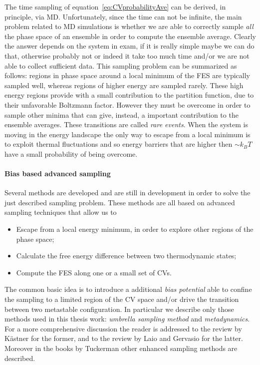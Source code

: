 The time sampling of equation~\eqref{eq:CVprobabilityAve} can be
derived, in principle, via \ac{MD}. Unfortunately, since the time can not be infinite, the main problem related
to \ac{MD} simulations is whether we are able to correctly sample \textit{all} the phase space of an ensemble in
order to compute the ensemble average. Clearly the answer depends on the system in exam, if it is really simple
maybe we can do that, otherwise probably not or indeed it take too much time and/or we are not able to collect
sufficient data. This sampling problem can be summarized as follows: regions in phase space around a local
minimum of the \ac{FES} are typically sampled well, whereas regions of higher energy are sampled rarely. These
high energy regions provide with a small contribution to the partition function, due to their unfavorable
Boltzmann factor. However they must be overcome in order to sample other minima that can give, instead, a
important contribution to the ensemble averages. These transitions are called \textit{rare events}. When the
system is moving in the energy landscape the only way to escape from a local minimum is to exploit thermal
fluctuations and so energy barriers that are higher then $\sim k_B T$ have a small probability of being overcome.

\paragraph{\textbf{Bias based advanced sampling}} Several methods are developed and are still in development in
order to solve the just described sampling problem. These methods are all based on advanced sampling techniques
that allow us to
\begin{itemize}
	\item Escape from a local energy minimum, in order to explore other regions of the phase space;
	\item Calculate the free energy difference between two thermodynamic states;
	\item Compute the \ac{FES} along one or a small set of \acp{CV}.
\end{itemize}
The common basic idea is to introduce a additional \textit{bias potential} able to confine the sampling to a
limited region of the \ac{CV} space and/or drive the transition between two metastable configuration. In
particular we describe only those methods used in this thesis work: \textit{umbrella sampling method} and
\textit{metadynamics}. For a more comprehensive discussion the reader is addressed to the review by Kästner
\cite{Umbrella} for the former, and to the review by Laio and Gervasio \cite{MetadReview} for the latter.
Moreover in the books by Tuckerman \cite{Tuckerman} other enhanced sampling methods are described.

